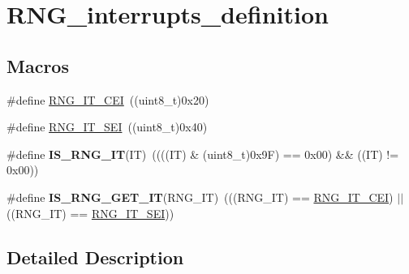 \hypertarget{group___r_n_g__interrupts__definition}{\section{R\-N\-G\-\_\-interrupts\-\_\-definition}
\label{group___r_n_g__interrupts__definition}
}
\subsection*{Macros}
\begin{DoxyCompactItemize}
\item 
\#define \hyperlink{group___r_n_g__interrupts__definition_ga8dabf5f116a92e59d18a224d14882927}{R\-N\-G\-\_\-\-I\-T\-\_\-\-C\-E\-I}~((uint8\-\_\-t)0x20)
\item 
\#define \hyperlink{group___r_n_g__interrupts__definition_ga2343cb323912a036fa46b081bbe751bc}{R\-N\-G\-\_\-\-I\-T\-\_\-\-S\-E\-I}~((uint8\-\_\-t)0x40)
\item 
\hypertarget{group___r_n_g__interrupts__definition_gaa110e0edaec1c15ed3a9620b001f8d91}{\#define {\bfseries I\-S\-\_\-\-R\-N\-G\-\_\-\-I\-T}(I\-T)~((((I\-T) \& (uint8\-\_\-t)0x9\-F) == 0x00) \&\& ((\-I\-T) != 0x00))}\label{group___r_n_g__interrupts__definition_gaa110e0edaec1c15ed3a9620b001f8d91}

\item 
\hypertarget{group___r_n_g__interrupts__definition_gafdbf6da44cfc8f3f2be5697a8fdf0595}{\#define {\bfseries I\-S\-\_\-\-R\-N\-G\-\_\-\-G\-E\-T\-\_\-\-I\-T}(R\-N\-G\-\_\-\-I\-T)~(((R\-N\-G\-\_\-\-I\-T) == \hyperlink{group___r_n_g__interrupts__definition_ga8dabf5f116a92e59d18a224d14882927}{R\-N\-G\-\_\-\-I\-T\-\_\-\-C\-E\-I}) $|$$|$ ((R\-N\-G\-\_\-\-I\-T) == \hyperlink{group___r_n_g__interrupts__definition_ga2343cb323912a036fa46b081bbe751bc}{R\-N\-G\-\_\-\-I\-T\-\_\-\-S\-E\-I}))}\label{group___r_n_g__interrupts__definition_gafdbf6da44cfc8f3f2be5697a8fdf0595}

\end{DoxyCompactItemize}


\subsection{Detailed Description}



